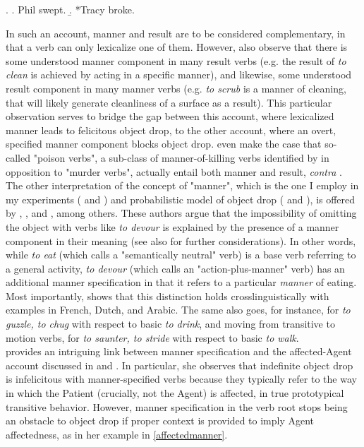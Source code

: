 \ex. \label{resultmanner} \a. \label{resultmanner1} Phil swept.
\b. \label{resultmanner2} *Tracy broke.

In such an account, manner and result are to be considered complementary, in that a verb can only lexicalize one of them. However, \textcite{LevinRappaportHovav2008} also observe that there is some understood manner component in many result verbs (e.g. the result of \textit{to clean} is achieved by acting in a specific manner), and likewise, some understood result component in many manner verbs (e.g. \textit{to scrub} is a manner of cleaning, that will likely generate cleanliness of a surface as a result). This particular observation serves to bridge the gap between this account, where lexicalized manner leads to felicitous object drop, to the other account, where an overt, specified manner component blocks object drop. \textcite[5]{BeaversKoontzGarboden2012} even make the case that so-called "poison verbs", a sub-class of manner-of-killing verbs identified by \textcite[230-233]{Levin1993} in opposition to "murder verbs", actually entail both manner and result, \textit{contra} \textcite{LevinRappaportHovav2008, RappaportLevin1998building}.\\
The other interpretation of the concept of "manner", which is the one I employ in my experiments ( and ) and probabilistic model of object drop ( and ), is offered by \textcite{Rice1988}, \textcite{FellbaumKegl1989taxonomic}, and \textcite{Naess2007}, among others. These authors argue that the impossibility of omitting the object with verbs like \textit{to devour} is explained by the presence of a manner component in their meaning (see also \textcite{Garcia-VelascoMunoz2002} for further considerations). In other words, while \textit{to eat} (which \textcite{Rice1988} calls a "semantically neutral" verb) is a base verb referring to a general activity, \textit{to devour} (which \textcite{Rice1988} calls an "action-plus-manner" verb) has an additional manner specification in that it refers to a particular \textit{manner} of eating. Most importantly, \textcite[49-50]{Melchin2019} shows that this distinction holds crosslinguistically with examples in French, Dutch, and Arabic. The same also goes, for instance, for \textit{to guzzle, to chug} with respect to basic \textit{to drink}, and moving from transitive to motion verbs, for \textit{to saunter, to stride} with respect to basic \textit{to walk}.\\
\textcite[139]{Naess2007} provides an intriguing link between manner specification and the affected-Agent account discussed in  and . In particular, she observes that indefinite object drop is infelicitous with manner-specified verbs because they typically refer to the way in which the Patient (crucially, not the Agent) is affected, in true prototypical transitive behavior. However, manner specification in the verb root stops being an obstacle to object drop if proper context is provided to imply Agent affectedness, as in her example in \ref{affectedmanner}.


